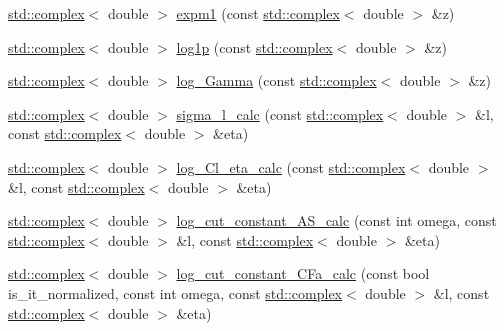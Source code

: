 \begin{DoxyCompactItemize}
\item 
\hyperlink{Constants_8h_a1c1b16cc02d518bbe753449171ab7033}{std\-::complex}$<$ double $>$ \hyperlink{complex__functions_8H_a827af44e1ec4984469146d0aef5fb7d7}{expm1} (const \hyperlink{Constants_8h_a1c1b16cc02d518bbe753449171ab7033}{std\-::complex}$<$ double $>$ \&z)
\item 
\hyperlink{Constants_8h_a1c1b16cc02d518bbe753449171ab7033}{std\-::complex}$<$ double $>$ \hyperlink{complex__functions_8H_a326a4b27a416b68e8da10621465bc240}{log1p} (const \hyperlink{Constants_8h_a1c1b16cc02d518bbe753449171ab7033}{std\-::complex}$<$ double $>$ \&z)
\item 
\hyperlink{Constants_8h_a1c1b16cc02d518bbe753449171ab7033}{std\-::complex}$<$ double $>$ \hyperlink{complex__functions_8H_a1c5c35389cf97adb07fa31047bed605d}{log\-\_\-\-Gamma} (const \hyperlink{Constants_8h_a1c1b16cc02d518bbe753449171ab7033}{std\-::complex}$<$ double $>$ \&z)
\item 
\hyperlink{Constants_8h_a1c1b16cc02d518bbe753449171ab7033}{std\-::complex}$<$ double $>$ \hyperlink{complex__functions_8H_a17f05f4656a3396e34ba65aa9b2c4c02}{sigma\-\_\-l\-\_\-calc} (const \hyperlink{Constants_8h_a1c1b16cc02d518bbe753449171ab7033}{std\-::complex}$<$ double $>$ \&l, const \hyperlink{Constants_8h_a1c1b16cc02d518bbe753449171ab7033}{std\-::complex}$<$ double $>$ \&eta)
\item 
\hyperlink{Constants_8h_a1c1b16cc02d518bbe753449171ab7033}{std\-::complex}$<$ double $>$ \hyperlink{complex__functions_8H_a84ed6d9371823631570efeeb1a3d8472}{log\-\_\-\-Cl\-\_\-eta\-\_\-calc} (const \hyperlink{Constants_8h_a1c1b16cc02d518bbe753449171ab7033}{std\-::complex}$<$ double $>$ \&l, const \hyperlink{Constants_8h_a1c1b16cc02d518bbe753449171ab7033}{std\-::complex}$<$ double $>$ \&eta)
\item 
\hyperlink{Constants_8h_a1c1b16cc02d518bbe753449171ab7033}{std\-::complex}$<$ double $>$ \hyperlink{complex__functions_8H_ad60e30fc6fa0cc3ba6633bdf500629fe}{log\-\_\-cut\-\_\-constant\-\_\-\-A\-S\-\_\-calc} (const int omega, const \hyperlink{Constants_8h_a1c1b16cc02d518bbe753449171ab7033}{std\-::complex}$<$ double $>$ \&l, const \hyperlink{Constants_8h_a1c1b16cc02d518bbe753449171ab7033}{std\-::complex}$<$ double $>$ \&eta)
\item 
\hyperlink{Constants_8h_a1c1b16cc02d518bbe753449171ab7033}{std\-::complex}$<$ double $>$ \hyperlink{complex__functions_8H_acd69fe12c59788ff46bb8cf01176cf2d}{log\-\_\-cut\-\_\-constant\-\_\-\-C\-Fa\-\_\-calc} (const bool is\-\_\-it\-\_\-normalized, const int omega, const \hyperlink{Constants_8h_a1c1b16cc02d518bbe753449171ab7033}{std\-::complex}$<$ double $>$ \&l, const \hyperlink{Constants_8h_a1c1b16cc02d518bbe753449171ab7033}{std\-::complex}$<$ double $>$ \&eta)

\end{DoxyCompactItemize}
